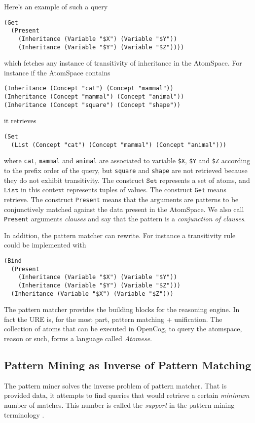 \documentclass[runningheads]{llncs}
\begin{document}
Here's an example of such a query
\begin{verbatim}
(Get
  (Present
    (Inheritance (Variable "$X") (Variable "$Y"))
    (Inheritance (Variable "$Y") (Variable "$Z"))))
\end{verbatim}
which fetches any instance of transitivity of inheritance in the
AtomSpace. For instance if the AtomSpace contains
\begin{verbatim}
(Inheritance (Concept "cat") (Concept "mammal"))
(Inheritance (Concept "mammal") (Concept "animal"))
(Inheritance (Concept "square") (Concept "shape"))
\end{verbatim}
it retrieves
\begin{verbatim}
(Set
  (List (Concept "cat") (Concept "mammal") (Concept "animal")))
\end{verbatim}
where \texttt{cat}, \texttt{mammal} and \texttt{animal} are associated
to variable \texttt{\$X}, \texttt{\$Y} and \texttt{\$Z} according to
the prefix order of the query, but \texttt{square} and \texttt{shape}
are not retrieved because they do not exhibit transitivity. The
construct $\texttt{Set}$ represents a set of atoms, and
$\texttt{List}$ in this context represents tuples of values. The
construct \texttt{Get} means retrieve. The construct \texttt{Present}
means that the arguments are patterns to be conjunctively matched
against the data present in the AtomSpace. We also call
\texttt{Present} arguments \emph{clauses} and say that the pattern is
a \emph{conjunction of clauses}.

In addition, the pattern matcher can rewrite. For instance a
transitivity rule could be implemented with
\begin{verbatim}
(Bind
  (Present
    (Inheritance (Variable "$X") (Variable "$Y"))
    (Inheritance (Variable "$Y") (Variable "$Z")))
  (Inheritance (Variable "$X") (Variable "$Z")))
\end{verbatim}
The pattern matcher provides the building blocks for the reasoning
engine. In fact the URE is, for the most part, pattern matching +
unification. The collection of atoms that can be executed in OpenCog,
to query the atomspace, reason or such, forms a language called
\emph{Atomese}.

\subsection{Pattern Mining as Inverse of Pattern Matching}

The pattern miner solves the inverse problem of pattern matcher. That
is provided data, it attempts to find queries that would retrieve a
certain \emph{minimum} number of matches. This number is called the
\emph{support} in the pattern mining terminology \cite{Chi2005Freq,
  Agrawal1994fastalgorithms}.
\end{document}
